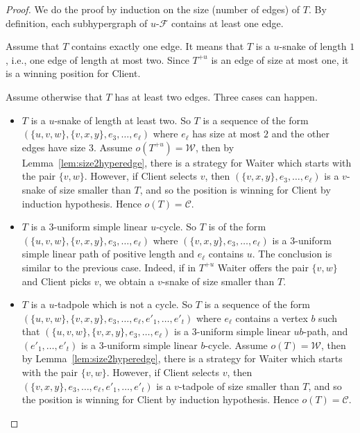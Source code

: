 \documentclass{article}
\newcommand{\hedge}{edge\xspace}
\newcommand{\hedges}{edges\xspace}
\newcommand{\Client}{\mathcal{C}}
\newcommand{\Waiter}{\mathcal{W}}
\newcommand{\uCwin}{u\text{-}\mathcal{F}}
\begin{document}
\begin{proof}
	We do the proof by induction on the size (number of \hedges) of \(T\). By definition, each subhypergraph of \(\uCwin\) contains at least one \hedge. 
	
	Assume that \(T \) contains exactly one \hedge. It means that \(T\) is a \(u\)-snake of length \(1\), i.e., one \hedge of length at most two. Since \(T^{+u}\) is an \hedge of size at most one, it is a winning position for Client.
	
	Assume otherwise that \(T\) has at least two \hedges. Three cases can happen.
	\begin{itemize}
		\item \(T\) is a \(u\)-snake of length at least two. So \(T\) is a sequence of the form \((\{u,v,w\},\{v,x,y\},e_3,\ldots,e_\ell)\) where \(e_{\ell}\) has size at most \(2\) and the other \hedges have size \(3\). 
		Assume \(o(T^{+u}) = \Waiter\), then by Lemma~\ref{lem:size2hyperedge}, there is a strategy for Waiter which starts with the pair \(\{v,w\}\). However, if Client selects \(v\), then \((\{v,x,y\},e_3,\ldots,e_\ell)\) is a \(v\)-snake of size smaller than \(T\), and so the position is winning for Client by induction hypothesis. Hence \(o(T) = \Client\).
		\item \(T\) is a \(3\)-uniform simple linear \(u\)-cycle. So \(T\) is of the form \( ( \{u,v,w\},\{v,x,y\},e_3,\ldots,e_\ell) \) where \( ( \{v,x,y\},e_3,\ldots,e_\ell) \) is a \(3\)-uniform simple linear path of positive length and \(e_{\ell}\) contains \(u\).
		The conclusion is similar to the previous case. Indeed, if in \(T^{+u}\) Waiter offers the pair \(\{v,w\}\) and Client picks \(v\), we obtain a \(v\)-snake of size smaller than \(T\).
		\item \(T\) is a \(u\)-tadpole which is not a cycle. So \(T\) is a sequence of the form \((\{u,v,w\},\{v,x,y\},e_3,\ldots,e_\ell, e'_1,\ldots,e'_t)\) where \(e_{\ell}\) contains a vertex \(b\) such that \((\{u,v,w\},\{v,x,y\},e_3,\ldots,e_\ell)\) is a \(3\)-uniform simple linear \(ub\)-path, and \((e'_1,\ldots,e'_t)\) is a \(3\)-uniform simple linear \(b\)-cycle. 
		Assume \(o(T) = \Waiter\), then by Lemma~\ref{lem:size2hyperedge}, there is a strategy for Waiter which starts with the pair \(\{v,w\}\). However, if Client selects \(v\), then
		\((\{v,x,y\},e_3,\ldots,e_\ell,e'_1,\ldots,e'_t)\) is a \(v\)-tadpole of size smaller than \(T\), and so the position is winning for Client by induction hypothesis. Hence \(o(T) = \Client\). \qedhere
	\end{itemize} 
\end{proof}
\end{document}
